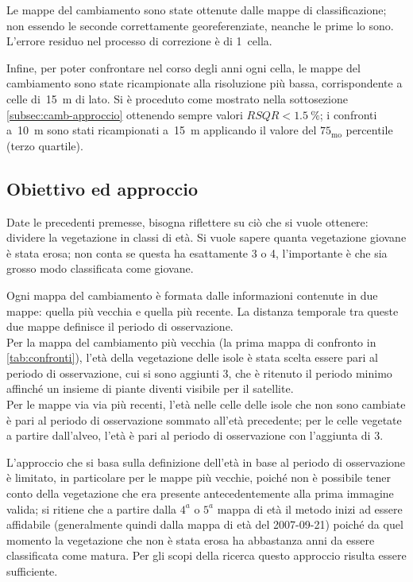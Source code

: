Le mappe del cambiamento sono state ottenute dalle mappe di classificazione; non essendo le seconde correttamente georeferenziate, neanche le prime lo sono. L'errore residuo nel processo di correzione è di 1~cella.

Infine, per poter confrontare nel corso degli anni ogni cella, le mappe del cambiamento sono state ricampionate alla risoluzione più bassa, corrispondente a celle di~\SI{15}{\m} di lato. Si è proceduto come mostrato nella sottosezione \ref{subsec:camb-approccio} ottenendo sempre valori $RSQR < \SI{1.5}{\percent}$; i confronti a~\SI{10}{\m} sono stati ricampionati a~\SI{15}{\m} applicando il valore del $75_\mathrm{mo}$ percentile (terzo quartile).


\subsection{Obiettivo ed approccio} 
Date le precedenti premesse, bisogna riflettere su ciò che si vuole ottenere: dividere la vegetazione in classi di età.
Si vuole sapere quanta vegetazione giovane è stata erosa; non conta se questa ha esattamente \SI{3}{\anni} o \SI{4}{\anni}, l'importante è che sia grosso modo classificata come giovane.

Ogni mappa del cambiamento è formata dalle informazioni contenute in due mappe: quella più vecchia e quella più recente. La distanza temporale tra queste due mappe definisce il periodo di osservazione.
\\
Per la mappa del cambiamento più vecchia (la prima mappa di confronto in \cref{tab:confronti}), l'età della vegetazione delle isole è stata scelta essere pari al periodo di osservazione, cui si sono aggiunti \SI{3}{\anni}, che è ritenuto il periodo minimo affinché un insieme di piante diventi visibile per il satellite.
\\
Per le mappe via via più recenti, l'età nelle celle delle isole che non sono cambiate è pari al periodo di osservazione sommato all'età precedente; per le celle vegetate a partire dall'alveo, l'età è pari al periodo di osservazione con l'aggiunta di \SI{3}{\anni}.

L'approccio che si basa sulla definizione dell'età in base al periodo di osservazione è limitato, in particolare per le mappe più vecchie, poiché non è possibile tener conto della vegetazione che era presente antecedentemente alla prima immagine valida;
si ritiene che a partire dalla $4^a$ o $5^a$ mappa di età il metodo inizi ad essere affidabile (generalmente quindi dalla mappa di età del 2007-09-21) poiché da quel momento la vegetazione che non è stata erosa ha abbastanza anni da essere classificata come matura.
Per gli scopi della ricerca questo approccio risulta essere sufficiente.

